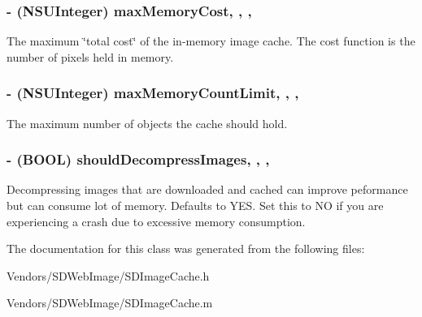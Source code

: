 \subsubsection[{max\+Memory\+Cost}]{\setlength{\rightskip}{0pt plus 5cm}-\/ (N\+S\+U\+Integer) max\+Memory\+Cost\hspace{0.3cm}{\ttfamily [read]}, {\ttfamily [write]}, {\ttfamily [nonatomic]}, {\ttfamily [assign]}}\label{interface_s_d_image_cache_ad4cb88a511e5be6961623db24c343405}
The maximum \char`\"{}total cost\char`\"{} of the in-\/memory image cache. The cost function is the number of pixels held in memory. \hypertarget{interface_s_d_image_cache_a25af9c52316058a4cfd4fda7e0bf707a}{}
\subsubsection[{max\+Memory\+Count\+Limit}]{\setlength{\rightskip}{0pt plus 5cm}-\/ (N\+S\+U\+Integer) max\+Memory\+Count\+Limit\hspace{0.3cm}{\ttfamily [read]}, {\ttfamily [write]}, {\ttfamily [nonatomic]}, {\ttfamily [assign]}}\label{interface_s_d_image_cache_a25af9c52316058a4cfd4fda7e0bf707a}
The maximum number of objects the cache should hold. \hypertarget{interface_s_d_image_cache_ae9994880d8e741fff3221b4ecca61a63}{}
\subsubsection[{should\+Decompress\+Images}]{\setlength{\rightskip}{0pt plus 5cm}-\/ (B\+O\+O\+L) should\+Decompress\+Images\hspace{0.3cm}{\ttfamily [read]}, {\ttfamily [write]}, {\ttfamily [nonatomic]}, {\ttfamily [assign]}}\label{interface_s_d_image_cache_ae9994880d8e741fff3221b4ecca61a63}
Decompressing images that are downloaded and cached can improve peformance but can consume lot of memory. Defaults to Y\+E\+S. Set this to N\+O if you are experiencing a crash due to excessive memory consumption. 

The documentation for this class was generated from the following files\+:\begin{DoxyCompactItemize}
\item 
Vendors/\+S\+D\+Web\+Image/S\+D\+Image\+Cache.\+h\item 
Vendors/\+S\+D\+Web\+Image/S\+D\+Image\+Cache.\+m\end{DoxyCompactItemize}
